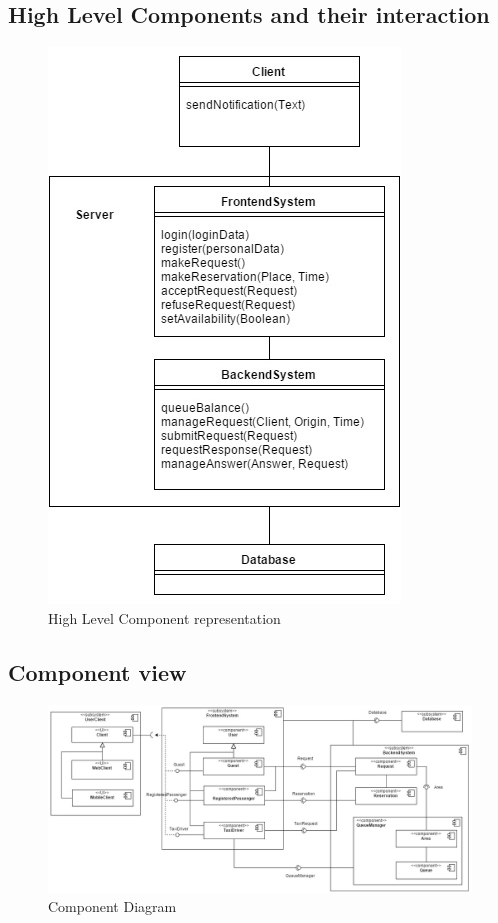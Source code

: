 	\subsection{High Level Components and their interaction}
	\begin{figure}[h!]
		\begin{center}
			\includegraphics[height=0.5\textheight]{../SE2_IMAGES/HLC}
			\caption{High Level Component representation}
		\end{center}
	\end{figure}
	\newpage
	\begin{landscape}
	\subsection{Component view}
		\begin{figure}[h!]
			\begin{center}
				\includegraphics[width=0.9\linewidth]{../SE2_IMAGES/ComponentDiagram}
				\caption{Component Diagram}
			\end{center}
		\end{figure}
	\end{landscape}
	\newpage

